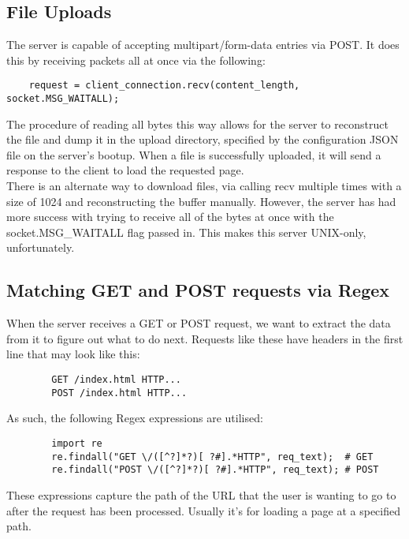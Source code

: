     \subsection{File Uploads}
    The server is capable of accepting multipart/form-data entries via POST. It does this by receiving packets all at once via the following:
    \begin{verbatim}
    request = client_connection.recv(content_length, socket.MSG_WAITALL);
    \end{verbatim}
The procedure of reading all bytes this way allows for the server to reconstruct the file and dump it in the upload directory, specified by the configuration JSON file on the server's bootup. When a file is successfully uploaded, it will send a response to the client to load the requested page. \\
There is an alternate way to download files, via calling recv multiple times with a size of 1024 and reconstructing the buffer manually. However, the server has had more success with trying to receive all of the bytes at once with the socket.MSG\_WAITALL flag passed in. This makes this server UNIX-only, unfortunately.
    \subsection{ Matching GET and POST requests via Regex}
    When the server receives a GET or POST request, we want to extract the data from it to figure out what to do next. Requests like these have headers in the first line that may look like this:\\
     \begin{verbatim}
        GET /index.html HTTP...
        POST /index.html HTTP...
    \end{verbatim}
    As such, the following Regex expressions are utilised:
    \begin{verbatim}
        import re
        re.findall("GET \/([^?]*?)[ ?#].*HTTP", req_text);  # GET
        re.findall("POST \/([^?]*?)[ ?#].*HTTP", req_text); # POST
    \end{verbatim}
These expressions capture the path of the URL that the user is wanting to go to after the request has been processed. Usually it's for loading a page at a specified path.
    
